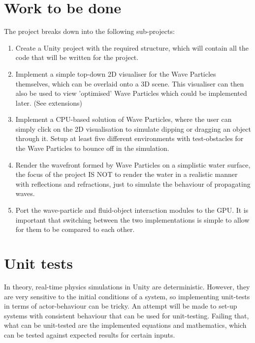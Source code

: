 \section*{Work to be done}

The project breaks down into the following sub-projects:

\begin{enumerate}

\item Create a Unity project with the required structure, which will contain all
the code that will be written for the project.

\item Implement a simple top-down 2D visualiser for the Wave Particles
themselves, which can be overlaid onto a 3D scene. This visualiser can then also
be used to view 'optimised' Wave Particles which could be implemented later.
(See extensions)

\item Implement a CPU-based solution of Wave Particles, where the user can
simply click on the 2D visualisation to simulate dipping or dragging an object
through it. Setup at least five different environments with test-obstacles for
the Wave Particles to bounce off in the simulation.

\item Render the wavefront formed by Wave Particles on a simplistic water
surface, the focus of the project IS NOT to render the water in a realistic
manner with reflections and refractions, just to simulate the behaviour of
propagating waves.

\item Port the wave-particle and fluid-object interaction modules to the GPU. It
is important that switching between the two implementations is simple to allow
for them to be compared to each other.

\end{enumerate}

\section*{Unit tests}

In theory, real-time physics simulations in Unity are deterministic. However,
they are very sensitive to the initial conditions of a system, so implementing
unit-tests in terms of actor-behaviour can be tricky. An attempt will be made to
set-up systems with consistent behaviour that can be used for unit-testing.
Failing that, what can be unit-tested are the implemented equations and
mathematics, which can be tested against expected results for certain inputs.

